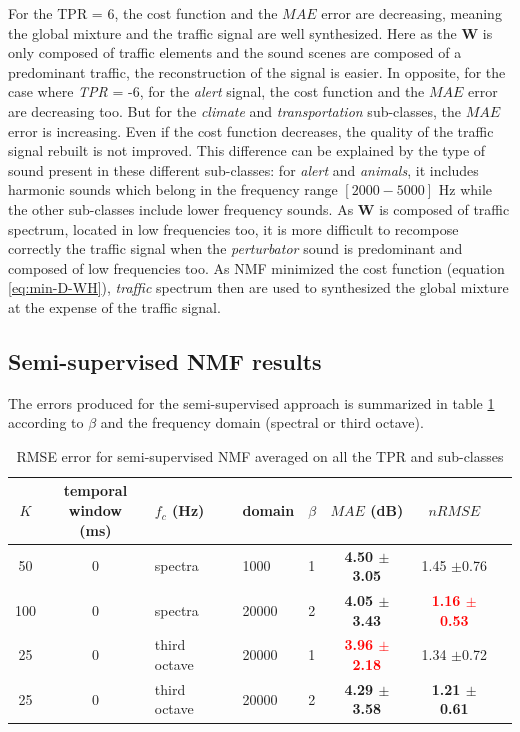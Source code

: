 \documentclass[twocolumn,a4paper,10pt]{article}
\begin{document}
For the TPR = 6, the cost function and the $MAE$ error are decreasing, meaning the global mixture and the traffic signal are well synthesized. Here as the $\mathbf{W}$ is only composed of traffic elements and the sound scenes are composed of a predominant traffic, the reconstruction of the signal is easier. In opposite, for the case where \textit{TPR} = -6, for the \textit{alert} signal, the cost function and the $MAE$ error are decreasing too. But for the \textit{climate} and \textit{transportation} sub-classes, the $MAE$ error is increasing. Even if the cost function decreases, the quality of the traffic signal rebuilt is not improved. This difference can be explained by the type of sound present in these different sub-classes: for \textit{alert} and \textit{animals}, it includes harmonic sounds which belong in the frequency range $\left[2000-5000\right]$ Hz while the other sub-classes include lower frequency sounds.  As $\mathbf{W}$ is composed of traffic spectrum, located in low frequencies too, it is more difficult to recompose correctly the traffic signal when the \textit{perturbator} sound is predominant and composed of low frequencies too. As NMF minimized the cost function (equation \ref{eq:min-D-WH}), \textit{traffic} spectrum then are used to synthesized the global mixture at the expense of the traffic signal.

\subsection{Semi-supervised NMF results}

The errors produced for the semi-supervised approach is summarized in table \ref{tab:results_semi_supervised} according to $\beta$ and the frequency domain (spectral or third octave).\\

\begin{table}
\centering
\begin{tabular}{cclllccc} 
$K$ & \shortstack{temporal\\window (ms)} & $f_c$ (Hz) & domain & $\beta$ & $MAE$ (dB) & $nRMSE$ \\ 
\hline 
 50 & 0 & spectra &  1000 & 1 & \textbf{4.50 $\pm$3.05} & 1.45 $\pm$0.76 \\
100 & 0 & spectra & 20000 & 2 & \textbf{4.05 $\pm$3.43} & \textbf{\textcolor{red}{1.16 $\pm$0.53}} \\ 
 25 & 0 & third octave & 20000 & 1 & \textbf{\textcolor{red}{3.96 $\pm$2.18}} & 1.34 $\pm$0.72 \\ 
 25 & 0 & third octave & 20000 & 2 & \textbf{4.29 $\pm$3.58} & \textbf{1.21 $\pm$0.61}
\end{tabular} 
\caption{RMSE error for semi-supervised NMF averaged on all the TPR and sub-classes}
\label{tab:results_semi_supervised}
\end{table}
\end{document}
